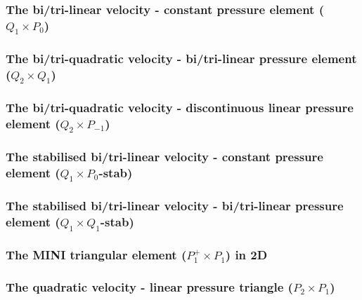 \subsubsection{The bi/tri-linear velocity - constant pressure element ($Q_1\times P_0$)}
\label{ss:pairq1p0}


\subsubsection{The bi/tri-quadratic velocity - bi/tri-linear pressure element ($Q_2 \times Q_1$)}
\label{ss:pairq2q1}


\subsubsection{The bi/tri-quadratic velocity - discontinuous linear pressure element ($Q_2 \times P_{-1}$)}
\label{ss:pairq2pm1}


\subsubsection{The stabilised bi/tri-linear velocity - constant pressure element ($Q_1\times P_0$-stab)}
\label{ss:pairq1p0stab}



\subsubsection{The stabilised bi/tri-linear velocity -  bi/tri-linear pressure element ($Q_1\times Q_1$-stab)}
\label{ss:pairq1q1stab}


\subsubsection{The MINI triangular element ($P_1^+\times P_1$) in 2D}
\label{pair:mini}


\subsubsection{The quadratic velocity - linear pressure triangle ($P_2\times P_1$)}
\label{ss:p2p1}


